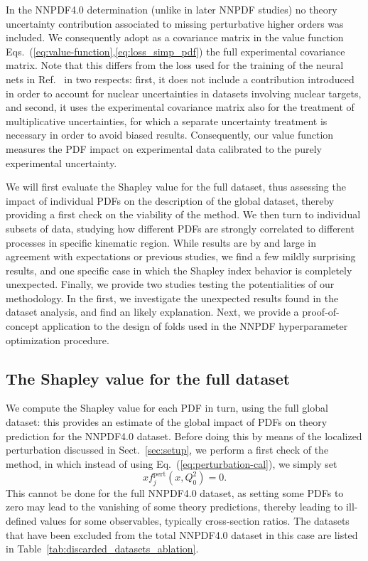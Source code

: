 \documentclass[11pt,a4paper]{article}
\begin{document}
In the NNPDF4.0  determination (unlike in later NNPDF studies) no theory uncertainty contribution associated to missing perturbative higher orders was included. We consequently adopt as a covariance matrix in the value function Eqs.~(\ref{eq:value-function},\ref{eq:loss_simp_pdf}) the full experimental covariance matrix. Note that this differs from the loss used for the training of the neural nets in  Ref.~\cite{NNPDF:2021njg} in  two respects: first, it does not include a contribution introduced in order to account for nuclear uncertainties in datasets involving nuclear targets, and second, it uses the experimental covariance matrix also for the treatment of multiplicative uncertainties, for which a separate uncertainty treatment is necessary in order to avoid biased results. 
Consequently, our value function measures the PDF impact on experimental data calibrated to the purely experimental uncertainty.

We will first evaluate the Shapley value for the full dataset, thus assessing the impact of individual PDFs on the description of the global dataset, thereby providing a first check on the viability of the method. We then turn to individual subsets of data, studying how different PDFs are strongly correlated to different processes in specific kinematic region. While results are by and large in agreement with expectations or previous studies, we find a few mildly surprising results, and one  specific case in which the Shapley index behavior is completely unexpected. Finally, we provide two studies testing the potentialities of our methodology. In the first, we investigate the unexpected results found in the dataset  analysis, and find an likely explanation. Next, we provide a  proof-of-concept application to the design of folds used in the NNPDF hyperparameter optimization procedure.

\subsection{The Shapley value for the  full dataset}
\label{sec:shap_full_data}

We compute the Shapley value for each PDF in turn, using the full global dataset: this provides an estimate of the global impact of PDFs on theory prediction for the NNPDF4.0 dataset.
Before doing this by means of the localized perturbation discussed in Sect.~\ref{sec:setup}, we perform a first check of the method, in which instead of using Eq.~(\ref{eq:perturbation-cal}), we simply set
%
\begin{equation}\label{eq:globzero}
xf_j^{\text{pert}}(x,Q_0^2) = 0.
\end{equation}
%
This cannot be done for the full NNPDF4.0 dataset, as setting some PDFs to zero may lead to the vanishing of some theory predictions, thereby leading to ill-defined values for some observables, typically cross-section ratios. The datasets that have been excluded from the total NNPDF4.0 dataset in this case are listed in Table~\ref{tab:discarded_datasets_ablation}.
\end{document}
